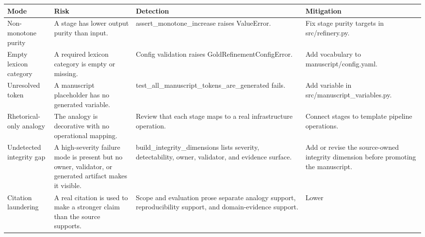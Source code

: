 \documentclass[
]{article}
\newcounter{none} %
\begin{document}
{\def\LTcaptype{none} %
\begin{longtable}[]{@{}
  >{\raggedright\arraybackslash}p{}
  >{\raggedright\arraybackslash}p{}
  >{\raggedright\arraybackslash}p{}
  >{\raggedright\arraybackslash}p{}@{}}
\toprule\noalign{}
\begin{minipage}[b]{\linewidth}\raggedright
Mode
\end{minipage} & \begin{minipage}[b]{\linewidth}\raggedright
Risk
\end{minipage} & \begin{minipage}[b]{\linewidth}\raggedright
Detection
\end{minipage} & \begin{minipage}[b]{\linewidth}\raggedright
Mitigation
\end{minipage} \\
\midrule\noalign{}
\endhead
\bottomrule\noalign{}
\endlastfoot
Non-monotone purity & A stage has lower output purity than input. &
assert\_monotone\_increase raises ValueError. & Fix stage purity targets
in src/refinery.py. \\
Empty lexicon category & A required lexicon category is empty or
missing. & Config validation raises GoldRefinementConfigError. & Add
vocabulary to manuscript/config.yaml. \\
Unresolved token & A manuscript placeholder has no generated variable. &
test\_all\_manuscript\_tokens\_are\_generated fails. & Add variable in
src/manuscript\_variables.py. \\
Rhetorical-only analogy & The analogy is decorative with no operational
mapping. & Review that each stage maps to a real infrastructure
operation. & Connect stages to template pipeline operations. \\
Undetected integrity gap & A high-severity failure mode is present but
no owner, validator, or generated artifact makes it visible. &
build\_integrity\_dimensions lists severity, detectability, owner,
validator, and evidence surface. & Add or revise the source-owned
integrity dimension before promoting the manuscript. \\
Citation laundering & A real citation is used to make a stronger claim
than the source supports. & Scope and evaluation prose separate analogy
support, reproducibility support, and domain-evidence support. & Lower

\end{longtable}}
\end{document}

